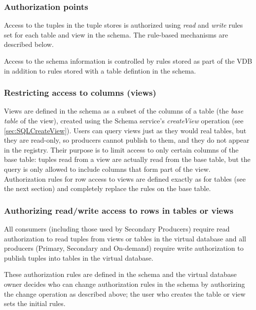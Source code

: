 \subsubsection{Authorization points}

Access to the tuples in the tuple stores is authorized using \textit{read} and 
\textit{write} rules set for each table and view in the schema. The rule-based 
mechanisms are described below.

Access to the schema information is controlled by rules stored as part of the
VDB in addition to rules stored with a table defintion in the schema.

\subsubsection{Restricting access to columns (views)}\label{sec:SecurityViews}

Views are defined in the schema as a subset of the columns of a table
(the \textit{base table} of the view), created using the Schema
service's \textit{createView} operation (see
\ref{sec:SQLCreateView}). Users can query views just as they would
real tables, but they are read-only, so producers cannot publish to
them, and they do not appear in the registry. Their purpose is to
limit access to only certain columns of the base table: tuples read
from a view are actually read from the base table, but the query is
only allowed to include columns that form part of the
view. Authorization rules for row access to views are defined exactly
as for tables (see the next section) and completely replace the rules
on the base table.

\subsubsection{Authorizing read/write access to rows in tables or views}

All consumers (including those used by Secondary Producers) require read
authorization to read tuples from views or tables in the virtual database and
all producers (Primary, Secondary and On-demand) require write authorization
to publish tuples into tables in the virtual database.

These authorization rules are defined in the schema and the virtual database
owner decides who can change authorization rules in the schema by authorizing
the change operation as described above; the user who creates the table or view
sets the initial rules.

